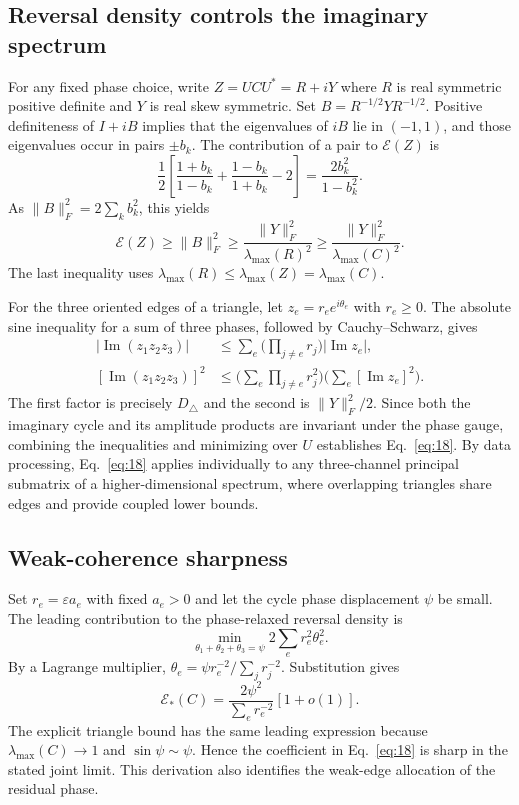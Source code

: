 \subsection{Reversal density controls the imaginary spectrum}
For any fixed phase choice, write $Z=UCU^*=R+iY$ where $R$ is real symmetric positive definite and $Y$ is real skew symmetric. Set $B=R^{-1/2}YR^{-1/2}$. Positive definiteness of $I+iB$ implies that the eigenvalues of $iB$ lie in $(-1,1)$, and those eigenvalues occur in pairs $\pm b_k$. The contribution of a pair to $\mathcal E(Z)$ is
\begin{equation}
 \frac12\left[\frac{1+b_k}{1-b_k}+\frac{1-b_k}{1+b_k}-2\right]
 =\frac{2b_k^2}{1-b_k^2}.
\end{equation}
As $\|B\|_F^2=2\sum_k b_k^2$, this yields
\begin{equation}
 \mathcal E(Z)\ge\|B\|_F^2
 \ge \frac{\|Y\|_F^2}{\lambda_{\max}(R)^2}
 \ge \frac{\|Y\|_F^2}{\lambda_{\max}(C)^2}.
\end{equation}
The last inequality uses $\lambda_{\max}(R)\le\lambda_{\max}(Z)=\lambda_{\max}(C)$.

For the three oriented edges of a triangle, let $z_e=r_e e^{i\theta_e}$ with $r_e\ge0$. The absolute sine inequality for a sum of three phases, followed by Cauchy--Schwarz, gives
\begin{align}
 |\operatorname{Im}(z_1z_2z_3)|
 &\le\sum_e \Big(\prod_{j\ne e}r_j\Big)|\operatorname{Im}z_e|,\\
 [\operatorname{Im}(z_1z_2z_3)]^2
 &\le\Big(\sum_e\prod_{j\ne e}r_j^2\Big)
       \Big(\sum_e [\operatorname{Im}z_e]^2\Big).
\end{align}
The first factor is precisely $D_\triangle$ and the second is $\|Y\|_F^2/2$. Since both the imaginary cycle and its amplitude products are invariant under the phase gauge, combining the inequalities and minimizing over $U$ establishes Eq.~\eqref{eq:18}. By data processing, Eq.~\eqref{eq:18} applies individually to any three-channel principal submatrix of a higher-dimensional spectrum, where overlapping triangles share edges and provide coupled lower bounds.

\subsection{Weak-coherence sharpness}
Set $r_e=\varepsilon a_e$ with fixed $a_e>0$ and let the cycle phase displacement $\psi$ be small. The leading contribution to the phase-relaxed reversal density is
\begin{equation}
 \min_{\theta_1+\theta_2+\theta_3=\psi}
 2\sum_e r_e^2\theta_e^2.
\end{equation}
By a Lagrange multiplier, $\theta_e=\psi r_e^{-2}/\sum_j r_j^{-2}$. Substitution gives
\begin{equation}
 \mathcal E_*(C)=\frac{2\psi^2}{\sum_e r_e^{-2}}[1+o(1)].
\end{equation}
The explicit triangle bound has the same leading expression because $\lambda_{\max}(C)\to1$ and $\sin\psi\sim\psi$. Hence the coefficient in Eq.~\eqref{eq:18} is sharp in the stated joint limit. This derivation also identifies the weak-edge allocation of the residual phase.

